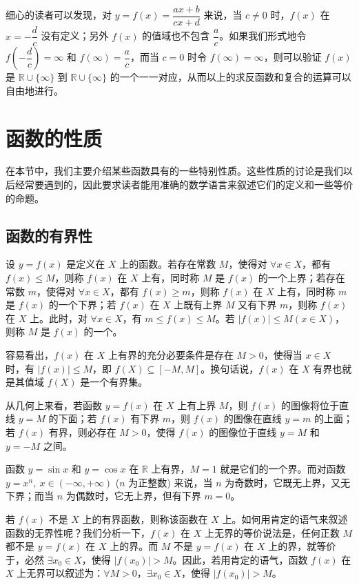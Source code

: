 \documentclass[UTF8,12pt,a4paper,fontset=fandol]{ctexbook}
\begin{document}
细心的读者可以发现，对 $y=f(x)=\dfrac{ax+b}{cx+d}$ 来说，当 $c\ne0$ 时，$f(x)$ 在 $x=-\dfrac dc$ 没有定义；另外 $f(x)$ 的值域也不包含 $\dfrac ac$。如果我们形式地令 $f(-\dfrac dc)=\infty$ 和 $f(\infty)=\dfrac ac$，而当 $c=0$ 时令 $f(\infty)=\infty$，则可以验证 $f(x)$ 是 $\mathbb{R}\cup\{\infty\}$ 到 $\mathbb{R}\cup\{\infty\}$ 的一个一一对应，从而以上的求反函数和复合的运算可以自由地进行。

\section{函数的性质}

在本节中，我们主要介绍某些函数具有的一些特别性质。这些性质的讨论是我们以后经常要遇到的，因此要求读者能用准确的数学语言来叙述它们的定义和一些等价的命题。

\subsection{函数的有界性}

设 $y=f(x)$ 是定义在 $X$ 上的函数。若存在常数 $M$，使得对 $\forall x\in X$，都有 $f(x)\leqslant M$，则称 $f(x)$ 在 $X$ 上有，同时称 $M$ 是 $f(x)$ 的一个上界；若存在常数 $m$，使得对 $\forall x\in X$，都有 $f(x)\geqslant m$，则称 $f(x)$ 在 $X$ 上有，同时称 $m$ 是 $f(x)$ 的一个下界；若 $f(x)$ 在 $X$ 上既有上界 $M$ 又有下界 $m$，则称 $f(x)$ 在 $X$ 上。此时，对 $\forall x\in X$，有 $m\leqslant f(x)\leqslant M$。若 $|f(x)|\leqslant M(x\in X)$，则称 $M$ 是 $f(x)$ 的一个。

容易看出，$f(x)$ 在 $X$ 上有界的充分必要条件是存在 $M>0$，使得当 $x\in X$ 时，有 $|f(x)|\leqslant M$，即 $f(X)\subseteq[-M,M]$。换句话说，$f(x)$ 在 $X$ 有界也就是其值域 $f(X)$ 是一个有界集。

从几何上来看，若函数 $y=f(x)$ 在 $X$ 上有上界 $M$，则 $f(x)$ 的图像将位于直线 $y=M$ 的下面；若 $f(x)$ 有下界 $m$，则 $f(x)$ 的图像在直线 $y=m$ 的上面；若 $f(x)$ 有界，则必存在 $M>0$，使得 $f(x)$ 的图像位于直线 $y=M$ 和 $y=-M$ 之间。

\noindent{}\quad 函数 $y=\sin x$ 和 $y=\cos x$ 在 $\mathbb{R}$ 上有界，$M=1$ 就是它们的一个界。而对函数 $y=x^n,\ x\in(-\infty,+\infty)$ ($n$ 为正整数) 来说，当 $n$ 为奇数时，它既无上界，又无下界；而当 $n$ 为偶数时，它无上界，但有下界 $m=0$。

若 $f(x)$ 不是 $X$ 上的有界函数，则称该函数在 $X$ 上。如何用肯定的语气来叙述函数的无界性呢？我们分析一下，$f(x)$ 在 $X$ 上无界的等价说法是，任何正数 $M$ 都不是 $y=f(x)$ 在 $X$ 上的界。而 $M$ 不是 $y=f(x)$ 在 $X$ 上的界，就等价于，必然 $\exists x_0\in X$，使得 $|f(x_0)|>M$。因此，若用肯定的语气，函数 $f(x)$ 在 $X$ 上无界可以叙述为：$\forall M>0$，$\exists x_0\in X$，使得 $|f(x_0)|>M$。
\end{document}
